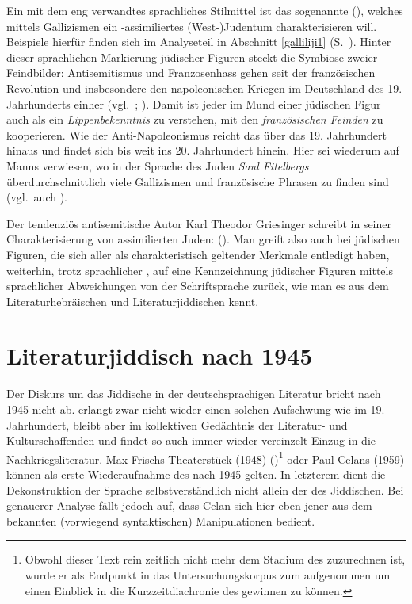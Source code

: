 Ein mit dem  eng verwandtes sprachliches Stilmittel ist das sogenannte  (\citealt[175]{Gelber1986}),\label{judenfranzoesischdeutscherstmals} welches mittels Gallizismen ein -assimiliertes (West-)Judentum charakterisieren will. Beispiele hierfür finden sich im Analyseteil in Abschnitt \ref{galliliji1} (S.\, \pageref{galliliji1}). Hinter dieser sprachlichen Markierung jüdischer Figuren steckt die Symbiose zweier Feindbilder: Antisemitismus und Franzosenhass gehen seit der französischen Revolution und insbesondere den napoleonischen Kriegen im Deutschland des 19. Jahrhunderts einher (vgl.\, \citealt[18, 68–70]{Gubser1998}; \citealt[139–149]{Hartung2006}). Damit ist jeder  im Mund einer jüdischen Figur auch als ein \textit{Lippenbekenntnis} zu verstehen, mit den \textit{französischen Feinden} zu kooperieren. Wie der Anti-Napoleonismus reicht das  über das 19. Jahrhundert hinaus und findet sich bis weit ins 20. Jahrhundert hinein. Hier sei wiederum auf Manns  verwiesen, wo in der Sprache des Juden \textit{Saul Fitelbergs} überdurchschnittlich viele Gallizismen und französische Phrasen zu finden sind (vgl.\, auch \citealt[142]{Hartung2006}).

Der tendenziös antisemitische Autor Karl Theodor Griesinger schreibt in seiner Charakterisierung von assimilierten Juden:  (\citealt[222]{Griesinger1838}). Man greift also auch bei jüdischen Figuren, die sich aller als charakteristisch  geltender Merkmale entledigt haben, weiterhin, trotz sprachlicher , auf eine Kennzeichnung jüdischer Figuren mittels sprachlicher Abweichungen von der Schriftsprache zurück, wie man es aus dem Literaturhebräischen und  Literaturjiddischen kennt. 



\section{Literaturjiddisch nach 1945} 
 
Der Diskurs um das Jiddische in der deutschsprachigen Literatur bricht nach 1945 nicht ab.  erlangt zwar nicht wieder einen solchen Aufschwung wie im 19. Jahrhundert, bleibt aber im kollektiven Gedächtnis der Literatur- und Kulturschaffenden und findet so auch immer wieder vereinzelt Einzug in die Nachkriegsliteratur. Max Frischs Theaterstück  (1948) ()\footnote{Obwohl dieser Text rein zeitlich nicht mehr dem Stadium des \hai{{\LiJieins}} zuzurechnen ist, wurde er als Endpunkt in das Untersuchungskorpus zum  aufgenommen um einen Einblick in die Kurzzeitdiachronie des \hai{{\LiJieins}} gewinnen zu können.} oder Paul Celans  (1959) können als erste Wiederaufnahme des \hai{{\LiJieins}} nach 1945 gelten. In letzterem dient die Dekonstruktion der Sprache selbstverständlich nicht allein der  des Jiddischen. Bei genauerer Analyse fällt jedoch auf, dass Celan sich hier eben jener aus dem \hai{{\LiJieins}} bekannten (vorwiegend syntaktischen) Manipulationen bedient. 

